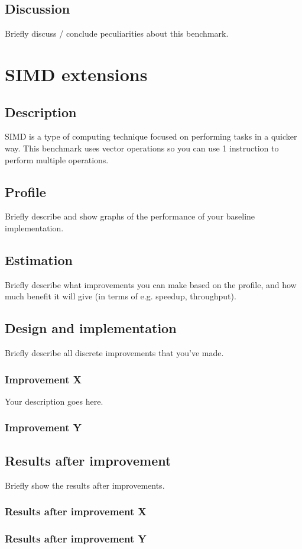 \documentclass[twocolumn]{article}
\begin{document}
\subsection{Discussion}
Briefly discuss / conclude peculiarities about this benchmark.

\section{SIMD extensions}
\subsection{Description}
SIMD is a type of computing technique focused on performing tasks in a quicker way. This benchmark uses vector operations so you can use 1 instruction to perform multiple operations.  
\subsection{Profile}
Briefly describe and show graphs of the performance of your baseline implementation.
\subsection{Estimation}
Briefly describe what improvements you can make based on the profile, and how much benefit it will give (in terms of e.g. speedup, throughput).
\subsection{Design and implementation}
Briefly describe all discrete improvements that you've made.
\subsubsection{Improvement X}
Your description goes here.
\subsubsection{Improvement Y}
\subsection{Results after improvement}
Briefly show the results after improvements.
\subsubsection{Results after improvement X}
\subsubsection{Results after improvement Y}
\end{document}
